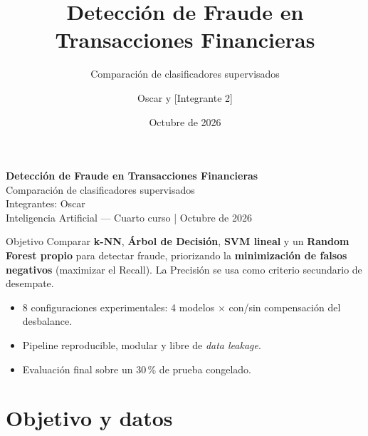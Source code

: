 \documentclass[aspectratio=169,11pt]{beamer}
\title[Detección de fraude]{Detección de Fraude en Transacciones Financieras}
\subtitle{Comparación de clasificadores supervisados}
\author{Oscar y [Integrante 2]}
\institute{Inteligencia Artificial --- Cuarto curso}
\date{Octubre de 2026}
\begin{document}
\begin{frame}[t]
  \begin{center}
    {\LARGE\bfseries Detección de Fraude en Transacciones Financieras}\\[0.2cm]
    {\large Comparación de clasificadores supervisados}\\[0.35cm]
    {\normalsize Integrantes: Oscar \quad \textbullet \quad [Integrante 2]}\\[0.12cm]
    {\small Inteligencia Artificial --- Cuarto curso \quad | \quad Octubre de 2026}
  \end{center}

  \vspace{0.25cm}
  \begin{block}{Objetivo}
    \small
    Comparar \textbf{k-NN}, \textbf{Árbol de Decisión}, \textbf{SVM lineal} y un
    \textbf{Random Forest propio} para detectar fraude, priorizando la
    \textbf{minimización de falsos negativos} (maximizar el Recall). La
    Precisión se usa como criterio secundario de desempate.
  \end{block}

  \vspace{0.1cm}
  \begin{itemize}
    \small
    \item 8 configuraciones experimentales: 4 modelos \(\times\) con/sin
          compensación del desbalance.
    \item Pipeline reproducible, modular y libre de \textit{data leakage}.
    \item Evaluación final sobre un 30\,\% de prueba congelado.
  \end{itemize}
\end{frame}

\section{Objetivo y datos}
\end{document}
